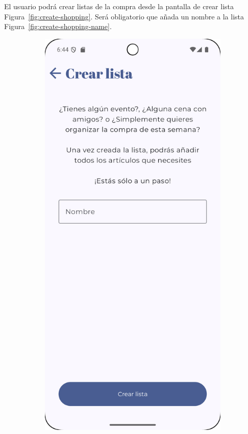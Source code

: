 El usuario podrá crear listas de la compra desde la pantalla de crear lista Figura~\ref{fig:create-shopping}. Será obligatorio que añada un nombre a la lista Figura~\ref{fig:create-shopping-name}.

\begin{figure}[H]
    \centering

    \begin{subfigure}[b]{0.3\textwidth}
      \includegraphics[width=\textwidth]{./img/manual/pinche_create_list.png}

\end{subfigure}
\end{figure}
